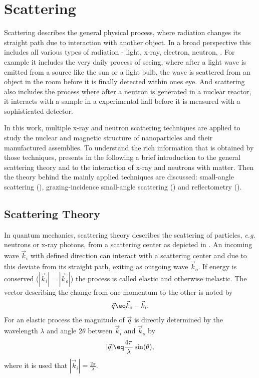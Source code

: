 \documentclass[\main/dresen_thesis.tex]{subfiles}
\begin{document}
\section{Scattering}\label{sec:theoreticalBackground:scattering}
Scattering describes the general physical process, where radiation changes its straight path due to interaction with another object.
In a broad perspective this includes all various types of radiation - light, x-ray, electron, neutron, \etc .
For example it includes the very daily process of seeing, where after a light wave is emitted from a source like the sun or a light bulb, the wave is scattered from an object in the room before it is finally detected within ones eye. 
And scattering also includes the process where after a neutron is generated in a nuclear reactor, it interacts with a sample in a experimental hall before it is measured with a sophisticated detector.

In this work, multiple x-ray and neutron scattering techniques are applied to study the nuclear and magnetic structure of nanoparticles and their manufactured assemblies. 
To understand the rich information that is obtained by those techniques,  presents in the following a brief introduction to the general scattering theory and  to the interaction of x-ray and neutrons with matter.
Then the theory behind the mainly applied techniques are discussed: small-angle scattering (), grazing-incidence small-angle scattering () and reflectometry ().
\subsection{Scattering Theory}\label{sec:theoreticalBackground:scattering:scatteringTheory}
In quantum mechanics, scattering theory describes the scattering of particles, \textit{e.g.} neutrons or x-ray photons, from a scattering center as depicted in . An incoming wave $\vec{k}_i$ with defined direction can interact with a scattering center and due to this deviate from its straight path, exiting as outgoing wave $\vec{k}_o$. 
If energy is conserved ($|\vec{k}_i| = |\vec{k}_o|$) the process is called elastic and otherwise inelastic.
The vector describing the change from one momentum to the other is noted by
\begin{align}
  \vec{q} \eq \vec{k}_o - \vec{k}_i.
\end{align}
For an elastic process the magnitude of $\vec{q}$ is directly determined by the wavelength $\lambda$ and angle $2\theta$ between $\vec{k}_i$ and $\vec{k}_o$ by
\begin{align}
  |\vec{q}| \eq \frac{4 \pi}{\lambda} \sin(\theta),
\end{align}
where it is used that $|\vec{k}_i| = \frac{2 \pi}{\lambda}$.
\end{document}
